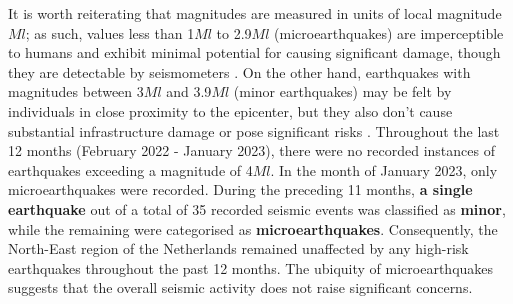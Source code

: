 \documentclass[a4paper]{article}
\begin{document}
\noindent It is worth reiterating that magnitudes are measured in units of local magnitude $Ml$; as such, values less than 1$Ml$ to 2.9$Ml$ (microearthquakes) are imperceptible to humans and exhibit minimal potential for causing significant damage, though they are detectable by seismometers \cite{britannica}. On the other hand, earthquakes with magnitudes between 3$Ml$ and 3.9$Ml$ (minor earthquakes) may be felt by individuals in close proximity to the epicenter, but they also don't cause substantial infrastructure damage or pose significant risks \cite{britannica}. Throughout the last 12 months (February 2022 - January 2023), there were no recorded instances of earthquakes exceeding a magnitude of 4$Ml$. In the month of January 2023, only microearthquakes were recorded. During the preceding 11 months, \textbf{a single earthquake} out of a total of 35 recorded seismic events was classified as \textbf{minor}, while the remaining were categorised as \textbf{microearthquakes}. Consequently, the North-East region of the Netherlands remained unaffected by any high-risk earthquakes throughout the past 12 months. The ubiquity of microearthquakes suggests that the overall seismic activity does not raise significant concerns.

\printbibliography
\end{document}
